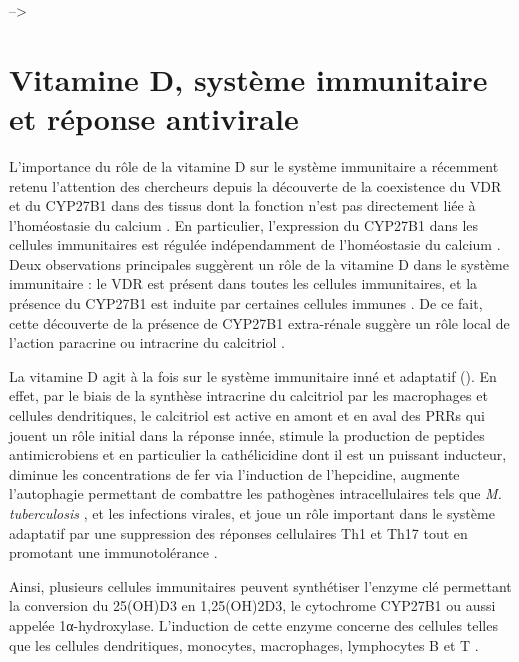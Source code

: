 \documentclass[
  a4paper,
  DIV=11,
  numbers=noendperiod,
  listof=totoc]{scrreprt}
\begin{document}
--\textgreater{}

\newpage{}

\chapter{Vitamine D, système immunitaire et réponse
antivirale}\label{vitamine-d-systuxe8me-immunitaire-et-ruxe9ponse-antivirale}

L'importance du rôle de la vitamine D sur le système immunitaire a
récemment retenu l'attention des chercheurs depuis la découverte de la
coexistence du \ac{VDR} et du \ac{CYP27B1} dans des tissus dont la
fonction n'est pas directement liée à l'homéostasie du calcium
\autocite{Zehnder.2001}. En particulier, l'expression du \ac{CYP27B1}
dans les cellules immunitaires est régulée indépendamment de
l'homéostasie du calcium \autocite{White.2022}. Deux observations
principales suggèrent un rôle de la vitamine D dans le système
immunitaire : le \ac{VDR} est présent dans toutes les cellules
immunitaires, et la présence du \ac{CYP27B1} est induite par certaines
cellules immunes \autocite{Giannini.2022}. De ce fait, cette découverte
de la présence de CYP27B1 extra-rénale suggère un rôle local de l'action
paracrine ou intracrine du calcitriol
\autocite{Hewison.2007,Bishop.2021}.

La vitamine D agit à la fois sur le système immunitaire inné et
adaptatif (). En effet, par le biais de la
synthèse intracrine du calcitriol par les macrophages et cellules
dendritiques, le calcitriol est active en amont et en aval des \acp{PRR}
qui jouent un rôle initial dans la réponse innée, stimule la production
de peptides antimicrobiens et en particulier la cathélicidine dont il
est un puissant inducteur, diminue les concentrations de fer via
l'induction de l'hepcidine, augmente l'autophagie permettant de
combattre les pathogènes intracellulaires tels que \emph{M.
tuberculosis} \autocite{Liu.2006}, et les infections virales, et joue un
rôle important dans le système adaptatif par une suppression des
réponses cellulaires \ac{Th1} et \ac{Th17} tout en promotant une
immunotolérance \autocites[ ]{Bishop.2021}{Ismailova.2022}.

Ainsi, plusieurs cellules immunitaires peuvent synthétiser l'enzyme clé
permettant la conversion du \ac{25(OH)D3} en \ac{1,25(OH)2D3}, le
cytochrome \ac{CYP27B1} ou aussi appelée 1α-hydroxylase. L'induction de
cette enzyme concerne des cellules telles que les cellules dendritiques,
monocytes, macrophages, lymphocytes B et T
\autocite{Giannini.2022,Dankers.2017}.
\end{document}
